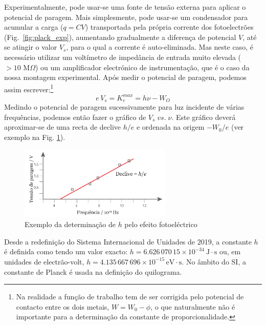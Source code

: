 \documentclass[a4paper,twoside,11pt]{report}      %
\begin{document}
Experimentalmente, pode usar-se uma fonte de tensão externa para aplicar o potencial de paragem. Mais simplesmente, pode usar-se um condensador para acumular a carga ($q=C V$) transportada pela própria corrente dos fotoelectrões (Fig.~\ref{fig:plack_exp}), aumentando gradualmente a diferença de potencial $V$, até se atingir o valor $V_s$, para o qual a corrente é  auto-eliminada. Mas neste caso, é necessário utilizar um voltímetro de impedância de entrada muito elevada ($> 10\textrm{ M}\Omega$) ou um amplificador electrónico de instrumentação, que é o caso da nossa montagem experimental.
 Após medir o potencial de paragem, podemos assim escrever:\footnote{Na realidade a função de trabalho tem de ser corrigida pelo potencial de contacto entre os dois metais, $W=W_0 - \phi$, o que naturalmente não é importante para a determinação da constante de proporcionalidade.}
\begin{equation}
	\label{eq:energia}
	e\,V_s= K_e^{max}= h \nu - W_O
\end{equation}
Medindo o potencial de paragem sucessivamente para luz incidente de várias frequências, podemos então fazer o gráfico de $V_s\; vs. \;\nu$. Este gráfico deverá aproximar-se de uma recta de declive $h/e$ e ordenada na origem  $-W_0/e$ (ver exemplo na Fig. \ref{fig:pe-graph}).


\begin{figure}[htb] 
	\centering 
	\includegraphics[width=0.65\textwidth]{pe-graph.pdf}
	\caption{Exemplo da determinação de $h$ pelo efeito fotoeléctrico} \label{fig:pe-graph}
\end{figure}

Desde a redefinição do Sistema Internacional de Unidades de 2019, a constante $h$ é definida como tendo um valor exacto: $h=6.626\,070\,15 \times 10^{-34}\ \textrm{J}\cdot \textrm{s}$ ou, em unidades de electrão-volt, $h=4.135\,667\,696\times 10^{-15}\,\textrm{eV}\cdot\textrm{s}$. No âmbito do SI, a constante de Planck é usada na definição do quilograma.

\newpage
\end{document}
